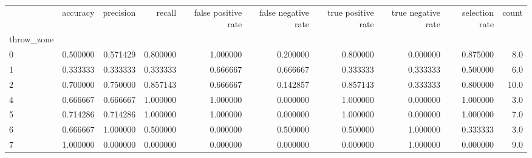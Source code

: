 \begin{tabular}{lrrrrrrrrr}
\toprule
{} &  accuracy &  precision &    recall &  false positive rate &  false negative rate &  true positive rate &  true negative rate &  selection rate &  count \\
throw\_zone &           &            &           &                      &                      &                     &                     &                 &        \\
\midrule
0          &  0.500000 &   0.571429 &  0.800000 &             1.000000 &             0.200000 &            0.800000 &            0.000000 &        0.875000 &    8.0 \\
1          &  0.333333 &   0.333333 &  0.333333 &             0.666667 &             0.666667 &            0.333333 &            0.333333 &        0.500000 &    6.0 \\
2          &  0.700000 &   0.750000 &  0.857143 &             0.666667 &             0.142857 &            0.857143 &            0.333333 &        0.800000 &   10.0 \\
4          &  0.666667 &   0.666667 &  1.000000 &             1.000000 &             0.000000 &            1.000000 &            0.000000 &        1.000000 &    3.0 \\
5          &  0.714286 &   0.714286 &  1.000000 &             1.000000 &             0.000000 &            1.000000 &            0.000000 &        1.000000 &    7.0 \\
6          &  0.666667 &   1.000000 &  0.500000 &             0.000000 &             0.500000 &            0.500000 &            1.000000 &        0.333333 &    3.0 \\
7          &  1.000000 &   0.000000 &  0.000000 &             0.000000 &             0.000000 &            0.000000 &            1.000000 &        0.000000 &    9.0 \\
\bottomrule
\end{tabular}
